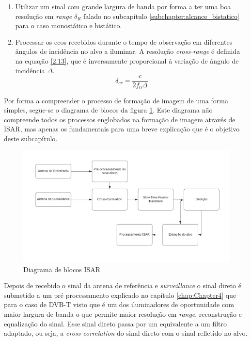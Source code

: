 \begin{enumerate}
\item Utilizar um sinal com grande largura de banda por forma a ter uma boa resolução em \textit{range} $\delta_{R}$ falado no subcapítulo \ref{subchapter:alcance_bistatico} para o caso monostático e bistático.

\item Processar os ecos recebidos durante o tempo de observação em diferentes ângulos de incidência no alvo a iluminar. A resolução \textit{cross-range} é definida na equação \ref{2.13}, que é inversamente proporcional à variação de ângulo de incidência $\Delta$.
\begin{equation} \label{2.13}
\delta_{cr}=\dfrac{c}{2f_{0}\Delta}
\end{equation}
\end{enumerate}

Por forma a compreender o processo de formação de imagem de uma forma simples, segue-se o diagrama de blocos da figura \ref{fig:img}. Este diagrama não compreende todos os processos englobados na formação de imagem através de \gls{ISAR}, mas apenas os fundamentais para uma breve explicação que é o objetivo deste subcapítulo.

\begin{figure}[h]
\centering
\includegraphics[scale=0.8]{chapters/ch2/assets/img}
\caption[Diagrama de blocos ISAR]{Diagrama de blocos ISAR}
\label{fig:img}
\end{figure}

Depois de recebido o sinal da antena de referência e \textit{surveillance} o sinal direto é submetido a um pré processamento explicado no capítulo \ref{chap:Chapter4} que para o caso de \gls{DVB-T} visto que é um dos iluminadores de oportunidade com maior largura de banda o que permite maior resolução em \textit{range}, reconstrução e equalização do sinal. Esse sinal direto passa por um equivalente a um filtro adaptado, ou seja, a \textit{cross-correlation} do sinal direto com o sinal refletido no alvo.\par 

